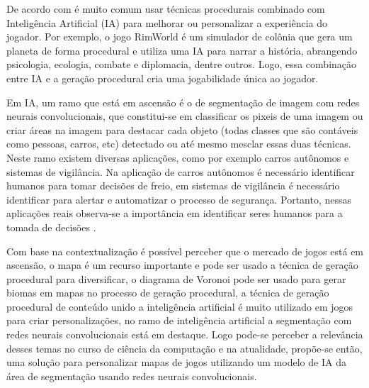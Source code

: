 De acordo com  é muito comum usar técnicas procedurais combinado com Inteligência Artificial (IA) para melhorar ou personalizar a experiência do jogador. Por exemplo, o jogo RimWorld é um simulador de colônia que gera um planeta de forma procedural e utiliza uma IA para narrar a história, abrangendo psicologia, ecologia, combate e diplomacia, dentre outros. Logo, essa combinação entre IA e a geração procedural cria uma jogabilidade única ao jogador.


Em IA, um ramo que está em ascensão é o de segmentação de imagem com redes neurais convolucionais, que constitui-se em classificar os pixeis de uma imagem ou criar áreas na imagem para destacar cada objeto (todas classes que são contáveis como pessoas, carros, etc) detectado ou até mesmo mesclar essas duas técnicas. Neste ramo existem diversas aplicações, como por exemplo carros autônomos e sistemas de vigilância.
Na aplicação de carros autônomos é necessário identificar humanos para tomar decisões de freio, em sistemas de vigilância é necessário identificar para alertar e automatizar o processo de segurança. Portanto, nessas aplicações reais observa-se a importância em identificar seres humanos para a tomada de decisões \space\cite{dp_semantic_segmantation}.



Com base na contextualização é possível perceber que o mercado de jogos está em ascensão, o mapa é um recurso importante e pode ser usado a técnica de geração procedural para diversificar, o diagrama de Voronoi pode ser usado para gerar biomas em mapas no processo de geração procedural, a técnica de geração procedural de conteúdo unido a inteligência artificial é muito utilizado em jogos para criar personalizações, no ramo de inteligência artificial a segmentação com redes neurais convolucionais está em destaque. Logo pode-se perceber a relevância desses temas no curso de ciência da computação e na atualidade, propõe-se então, uma solução para personalizar mapas de jogos utilizando um modelo de IA da área de segmentação usando redes neurais convolucionais.

